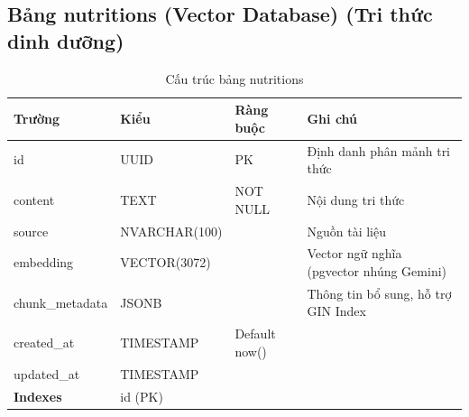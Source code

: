 \documentclass[12pt,a4paper]{article}
\begin{document}
\subsection{Bảng nutritions (Vector Database) (Tri thức dinh dưỡng)}
\begin{longtable}{|l|l|l|p{5.5cm}|}
    \caption{Cấu trúc bảng nutritions}                                                                              \\
    \hline
    \rowcolor{headerblue}
    \textbf{Trường}  & \textbf{Kiểu}                & \textbf{Ràng buộc} & \textbf{Ghi chú}                         \\
    \hline
    id               & UUID                         & PK                 & Định danh phân mảnh tri thức             \\
    \hline
    content          & TEXT                         & NOT NULL           & Nội dung tri thức                        \\
    \hline
    source           & NVARCHAR(100)                &                    & Nguồn tài liệu                           \\
    \hline
    embedding        & VECTOR(3072)                 &                    & Vector ngữ nghĩa (pgvector nhúng Gemini) \\
    \hline
    chunk\_metadata  & JSONB                        &                    & Thông tin bổ sung, hỗ trợ GIN Index      \\
    \hline
    created\_at      & TIMESTAMP                    & Default now()      &                                          \\
    \hline
    updated\_at      & TIMESTAMP                    &                    &                                          \\
    \hline
    \rowcolor{headerblue}
    \textbf{Indexes} & \multicolumn{3}{l|}{id (PK)}                                                                 \\
    \hline
\end{longtable}
\end{document}
